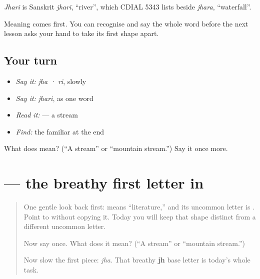 \begin{cousinweb}
\emph{Jhari} is Sanskrit \emph{jharī}, \textquotedblleft{}river\textquotedblright{}, which CDIAL 5343 lists beside \emph{jhara}, \textquotedblleft{}waterfall\textquotedblright{}.
\end{cousinweb}

\begin{grammarlens}[title={What you've built}]
Meaning comes first. You can recognise and say the whole word before the next lesson asks your hand to take its first shape apart.
\end{grammarlens}

\subsection*{Your turn}
\begin{itemize}
\raggedright
  \item \emph{Say it:} \emph{jha · ri}, slowly
  \item \emph{Say it:} \emph{jhari}, as one word
  \item \emph{Read it:} \textbf{} — a stream
  \item \emph{Find:} the familiar \textbf{} at the end
\end{itemize}

\begin{tcolorbox}[breakable,colback=teal!4,colframe=teal!35!black,title={Before you move on}]
What does \textbf{} mean? (\textquotedblleft{}A stream\textquotedblright{} or \textquotedblleft{}mountain stream.\textquotedblright{}) Say it once more.
\end{tcolorbox}
\section[\texorpdfstring{\te{ఝ} (jha)}{ఝ (jha)}]{ — the breathy first letter in }

\label{lesson:TE-S173-letter-jha}



\begin{quote}
One gentle look back first: \textbf{} means \textquotedblleft{}literature,\textquotedblright{} and its uncommon letter is \textbf{}. Point to \textbf{} without copying it. Today you will keep that shape distinct from a different uncommon letter.

Now say \textbf{} once. What does it mean? (\textquotedblleft{}A stream\textquotedblright{} or \textquotedblleft{}mountain stream.\textquotedblright{})

Now slow the first piece: \emph{jha}. That breathy \textbf{jh} base letter is today's whole task.
\end{quote}

